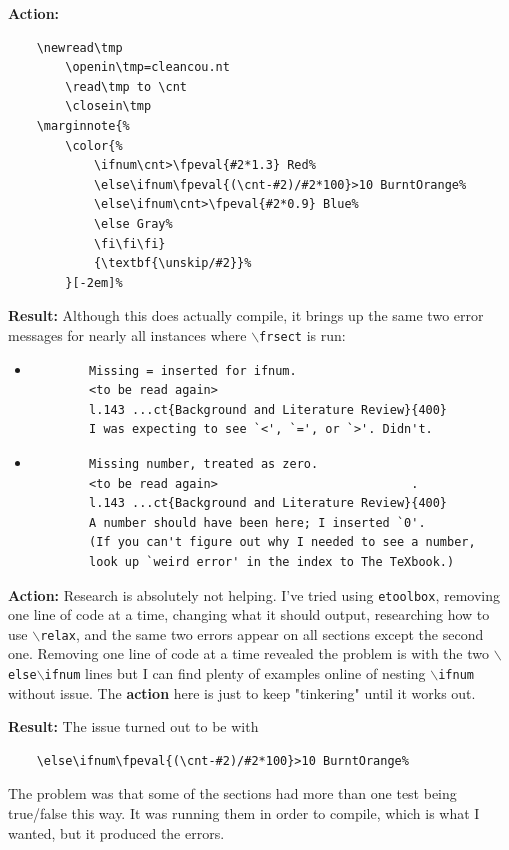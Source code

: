\documentclass[12pt]{article}
\begin{document}
\textbf{Action:}
\begin{verbatim}
    \newread\tmp       
        \openin\tmp=cleancou.nt
        \read\tmp to \cnt
        \closein\tmp
    \marginnote{%
        \color{%
            \ifnum\cnt>\fpeval{#2*1.3} Red%
            \else\ifnum\fpeval{(\cnt-#2)/#2*100}>10 BurntOrange%
            \else\ifnum\cnt>\fpeval{#2*0.9} Blue%
            \else Gray%
            \fi\fi\fi}
            {\textbf{\unskip/#2}}%
        }[-2em]%
\end{verbatim}

\textbf{Result:} Although this does actually compile, it brings up the same two error messages for nearly all instances where \texttt{$\backslash$frsect} is run: 
\begin{itemize}
    \item 
        \begin{verbatim}
        Missing = inserted for ifnum.
        <to be read again>
        l.143 ...ct{Background and Literature Review}{400}
        I was expecting to see `<', `=', or `>'. Didn't.
    \end{verbatim}
    \item 
    \begin{verbatim}
        Missing number, treated as zero.
        <to be read again>                           .
        l.143 ...ct{Background and Literature Review}{400}
        A number should have been here; I inserted `0'.
        (If you can't figure out why I needed to see a number,
        look up `weird error' in the index to The TeXbook.)
    \end{verbatim}
\end{itemize}

\textbf{Action:} Research is absolutely not helping. I've tried using \texttt{etoolbox}, removing one line of code at a time, changing what it should output, researching how to use \texttt{$\backslash$relax}, and the same two errors appear on all sections except the second one. Removing one line of code at a time revealed the problem is with the two \texttt{$\backslash$else$\backslash$ifnum} lines but I can find plenty of examples online of nesting \texttt{$\backslash$ifnum} without issue. The \textbf{action} here is just to keep "tinkering" until it works out.

\textbf{Result:} The issue turned out to be with \begin{verbatim}
    \else\ifnum\fpeval{(\cnt-#2)/#2*100}>10 BurntOrange%
\end{verbatim}
The problem was that some of the sections had more than one test being true/false this way. It was running them in order to compile, which is what I wanted, but it produced the errors.
\end{document}
